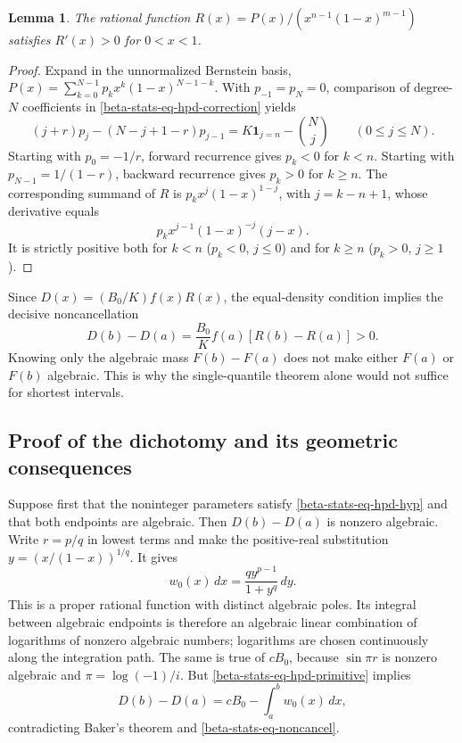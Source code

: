 \documentclass[11pt,a4paper]{article}
\newtheorem{lemma}[theorem]{Lemma}
\theoremstyle{definition}
\theoremstyle{remark}
\numberwithin{equation}{section}
\begin{document}
\begin{lemma}
\label{beta-stats-lem-monotone}
The rational function
$R(x)=P(x)/(x^{n-1}(1-x)^{m-1})$ satisfies $R'(x)>0$ for $0<x<1$.
\end{lemma}

\begin{proof}
Expand in the unnormalized Bernstein basis,
$P(x)=\sum_{k=0}^{N-1}p_kx^k(1-x)^{N-1-k}$.
With $p_{-1}=p_N=0$, comparison of degree-$N$ coefficients in
\eqref{beta-stats-eq-hpd-correction} yields
\[
(j+r)p_j-(N-j+1-r)p_{j-1}
=K\mathbf1_{j=n}-\binom Nj\qquad(0\le j\le N).
\]
Starting with $p_0=-1/r$, forward recurrence gives $p_k<0$ for
$k<n$. Starting with $p_{N-1}=1/(1-r)$, backward recurrence gives
$p_k>0$ for $k\ge n$. The corresponding summand of $R$ is
$p_kx^j(1-x)^{1-j}$, with $j=k-n+1$, whose derivative equals
\[
p_kx^{j-1}(1-x)^{-j}(j-x).
\]
It is strictly positive both for $k<n$ ($p_k<0$, $j\le0$) and
for $k\ge n$ ($p_k>0$, $j\ge1$).
\end{proof}

Since $D(x)=(B_0/K)f(x)R(x)$, the equal-density condition implies
the decisive noncancellation
\begin{equation}
\label{beta-stats-eq-noncancel}
D(b)-D(a)=\frac{B_0}{K}f(a)[R(b)-R(a)]>0.
\end{equation}
Knowing only the algebraic mass $F(b)-F(a)$ does not make either
$F(a)$ or $F(b)$ algebraic. This is why the single-quantile theorem
alone would not suffice for shortest intervals.

\subsection{Proof of the dichotomy and its geometric consequences}

Suppose first that the noninteger parameters satisfy
\eqref{beta-stats-eq-hpd-hyp} and that both endpoints are algebraic.
Then $D(b)-D(a)$ is nonzero algebraic. Write $r=p/q$ in lowest terms
and make the positive-real substitution
$y=(x/(1-x))^{1/q}$. It gives
\[
w_0(x)\,dx=\frac{q y^{p-1}}{1+y^q}\,dy.
\]
This is a proper rational function with distinct algebraic poles.
Its integral between algebraic endpoints is therefore an algebraic
linear combination of logarithms of nonzero algebraic numbers;
logarithms are chosen continuously along the integration path.
The same is true of $cB_0$, because $\sin\pi r$ is nonzero
algebraic and $\pi=\log(-1)/i$. But
\eqref{beta-stats-eq-hpd-primitive} implies
\[
D(b)-D(a)=cB_0-\int_a^b w_0(x)\,dx,
\]
contradicting Baker's theorem and
\eqref{beta-stats-eq-noncancel}.
\end{document}
